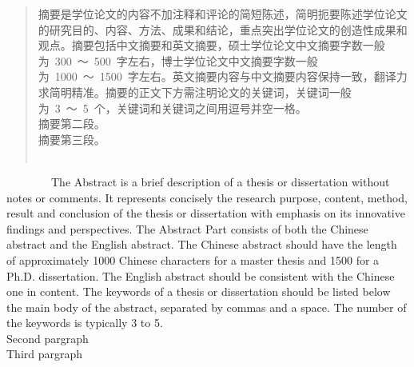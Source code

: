 \begin{abstract}
\setlength\parindent{2em}
摘要是学位论文的内容不加注释和评论的简短陈述，简明扼要陈述学位论文的研究目的、内容、方法、成果和结论，重点突出学位论文的创造性成果和观点。摘要包括中文摘要和英文摘要，硕士学位论文中文摘要字数一般为~300~～~500~字左右，博士学位论文中文摘要字数一般为~1000~～~1500~字左右。英文摘要内容与中文摘要内容保持一致，翻译力求简明精准。摘要的正文下方需注明论文的关键词，关键词一般为~3~～~5~个，关键词和关键词之间用逗号并空一格。\\
\indent 摘要第二段。\\
\indent 摘要第三段。\\
 \\
\end{abstract}

\begin{englishabstract}
    \setlength\parindent{2em}
    ~~~~~~~~The Abstract is a brief description of a thesis or dissertation without notes or comments. It represents concisely the research purpose, content, method, result and conclusion of the thesis or dissertation with emphasis on its innovative findings and perspectives. The Abstract Part consists of both the Chinese abstract and the English abstract. The Chinese abstract should have the length of approximately 1000 Chinese characters for a master thesis and 1500 for a Ph.D. dissertation. The English abstract should be consistent with the Chinese one in content. The keywords of a thesis or dissertation should be listed below the main body of the abstract, separated by commas and a space. The number of the keywords is typically 3 to 5.\\
    \indent Second pargraph\\
    \indent Third pargraph\\
 \\

\end{englishabstract}

